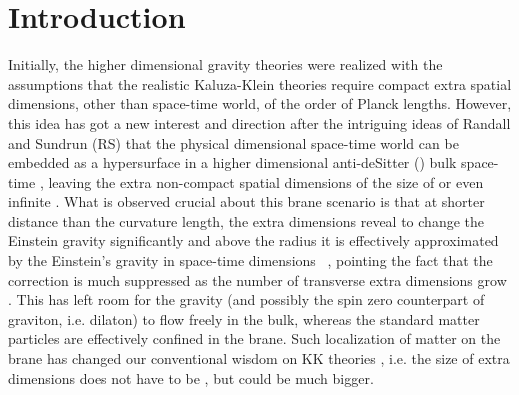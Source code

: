 \documentclass[a4paper,12pt]{article}
\begin{document}
\section{Introduction}
Initially, the higher dimensional gravity theories \cite{BSD,CWE} 
were realized with the assumptions that the realistic Kaluza-Klein theories
\cite{APP} require compact extra spatial dimensions, other than 
\coordHE{} space-time world, of the order of Planck lengths. However, this idea 
has got a new interest and direction after the intriguing ideas of Randall
and Sundrun (RS) that the physical \coordHE{} dimensional space-time world can 
be embedded as a hypersurface in a higher dimensional anti-deSitter (\coordHE{}) 
bulk space-time \cite{RS1}, leaving the extra non-compact spatial dimensions 
\cite{VAR} of the size of \coordHE{} or even infinite \cite{RS1,NAH}. What is 
observed crucial about this brane scenario is that at shorter distance than 
the \coordHE{} curvature length, the extra dimensions reveal to change the 
Einstein gravity significantly and above the \coordHE{} radius it is effectively 
approximated by the Einstein's gravity in \coordHE{} space-time dimensions~ 
\cite{RS1,CCS}, pointing the fact that the correction is much suppressed 
as the number of transverse extra dimensions grow \cite{TGM}. This has left 
room for the gravity (and possibly the spin zero counterpart of graviton, 
i.e. dilaton) to flow freely in the bulk, whereas the standard matter 
particles are effectively confined in the brane. Such localization of matter 
on the brane \cite{RS1,TGM,ODA} has changed our conventional wisdom on 
KK theories \cite{APP}, i.e. the size of extra dimensions does not have to 
be \coordHE{}, but could be much bigger.
\end{document}
